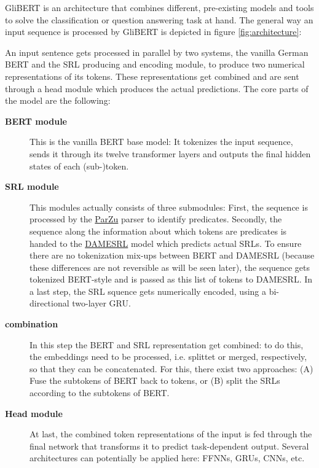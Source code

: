 GliBERT is an architecture that combines different, pre-existing models and
tools to solve the classification or question answering task at hand. The
general way an input sequence is processed by GliBERT is depicted in figure
\ref{fig:architecture}:



An input sentence gets processed in parallel by two systems, the vanilla German BERT
and the SRL producing and encoding module, to produce two numerical representations
of its tokens. These representations get combined and are sent through a head module
which produces the actual predictions. The core parts of the model are the following:

\begin{description}
	\item[\textbf{BERT module}] This is the vanilla BERT base model: It tokenizes the input sequence, sends it through its twelve transformer layers and outputs the final hidden states of each (sub-)token.
  \item[\textbf{SRL module}] This modules actually consists of three submodules: First, the sequence is processed by the \href{https://github.com/rsennrich/ParZu}{ParZu} \citep{sennrich2009new} parser to identify predicates.
	Secondly, the sequence along the information about which tokens are predicates is handed to the \href{https://liir.cs.kuleuven.be/software_pages/damesrl.php}{DAMESRL} model \citep{do2018flexible} which predicts actual SRLs.
	To ensure there are no tokenization mix-ups between BERT and DAMESRL (because these differences are not reversible as will be seen later), the sequence gets tokenized BERT-style and is passed as this list of tokens to DAMESRL. In a last step,
	the SRL squence gets numerically encoded, using a bi-directional two-layer GRU.
  \item[\textbf{combination}] In this step the BERT and SRL representation get combined: to do this, the embeddings need to be processed, i.e. splittet or merged, respectively, so that they can be concatenated.
	For this, there exist two approaches:
	(A) Fuse the subtokens of BERT back to tokens, or (B) split the SRLs according to the subtokens of BERT.
  \item[\textbf{Head module}] At last, the combined token representations of the input is fed through the final network that transforms it to predict task-dependent output. Several architectures can potentially be applied here: FFNNs, GRUs, CNNs, etc.
\end{description}

